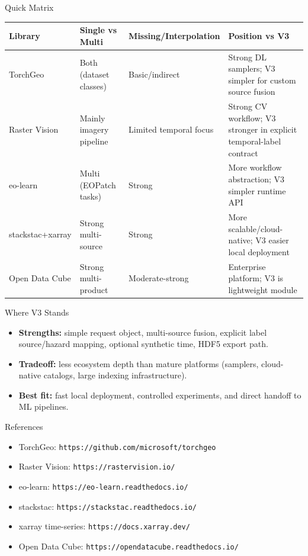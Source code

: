 \documentclass{beamer}
\begin{document}
\begin{frame}{Quick Matrix}
\small
\begin{tabular}{>{\raggedright\arraybackslash}p{2.2cm} >{\raggedright\arraybackslash}p{2.1cm} >{\raggedright\arraybackslash}p{2.1cm} >{\raggedright\arraybackslash}p{3.8cm}}
\toprule
Library & Single vs Multi & Missing/Interpolation & Position vs V3 \\
\midrule
TorchGeo & Both (dataset classes) & Basic/indirect & Strong DL samplers; V3 simpler for custom source fusion \\
\midrule
Raster Vision & Mainly imagery pipeline & Limited temporal focus & Strong CV workflow; V3 stronger in explicit temporal-label contract \\
\midrule
eo-learn & Multi (EOPatch tasks) & Strong & More workflow abstraction; V3 simpler runtime API \\
\midrule
stackstac+xarray & Strong multi-source & Strong & More scalable/cloud-native; V3 easier local deployment \\
\midrule
Open Data Cube & Strong multi-product & Moderate-strong & Enterprise platform; V3 is lightweight module \\
\bottomrule
\end{tabular}
\end{frame}

\begin{frame}{Where V3 Stands}
\begin{itemize}
  \item \textbf{Strengths:} simple request object, multi-source fusion, explicit label source/hazard mapping, optional synthetic time, HDF5 export path.
  \item \textbf{Tradeoff:} less ecosystem depth than mature platforms (samplers, cloud-native catalogs, large indexing infrastructure).
  \item \textbf{Best fit:} fast local deployment, controlled experiments, and direct handoff to ML pipelines.
\end{itemize}
\end{frame}

\begin{frame}{References}
\footnotesize
\begin{itemize}
  \item TorchGeo: \texttt{https://github.com/microsoft/torchgeo}
  \item Raster Vision: \texttt{https://rastervision.io/}
  \item eo-learn: \texttt{https://eo-learn.readthedocs.io/}
  \item stackstac: \texttt{https://stackstac.readthedocs.io/}
  \item xarray time-series: \texttt{https://docs.xarray.dev/}
  \item Open Data Cube: \texttt{https://opendatacube.readthedocs.io/}
\end{itemize}
\end{frame}
\end{document}

